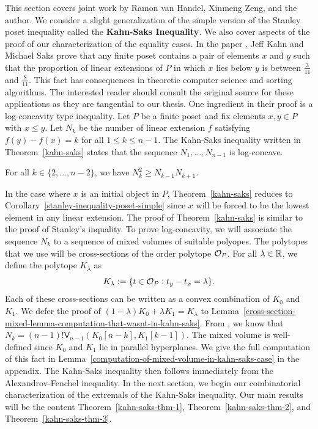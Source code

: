 \documentclass{puthesis-UG}
\begin{document}
This section covers joint work by Ramon van Handel, Xinmeng Zeng, and the author. We consider a slight generalization of the simple version of the Stanley poset inequality called the \textbf{Kahn-Saks Inequality}. We also cover aspects of the proof of our characterization of the equality cases. In the paper \cite{balancing-poset-extensions}, Jeff Kahn and Michael Saks prove that any finite poset contains a pair of elements $x$ and $y$ such that the proportion of linear extensions of $P$ in which $x$ lies below $y$ is between $\frac{3}{11}$ and $\frac{8}{11}$. This fact has consequences in theoretic computer science and sorting algorithms. The interested reader should consult the original source \cite{balancing-poset-extensions} for these applications as they are tangential to our thesis. One ingredient in their proof is a log-concavity type inequality. Let $P$ be a finite poset and fix elements $x, y \in P$ with $x \leq y$. Let $N_k$ be the number of linear extension $f$ satisfying $f(y) - f(x) = k$ for all $1 \leq k \leq n-1$. The Kahn-Saks inequality written in Theorem~\ref{kahn-saks} states that the sequence $N_1, \ldots, N_{n-1}$ is log-concave. 

\begin{thm} \label{kahn-saks}
	For all $k \in \{2, \ldots, n-2\}$, we have $N_k^2 \geq N_{k-1} N_{k+1}$. 
\end{thm}

In the case where $x$ is an initial object in $P$, Theorem~\ref{kahn-saks} reduces to Corollary~\ref{stanley-inequality-poset-simple} since $x$ will be forced to be the lowest element in any linear extension. The proof of Theorem~\ref{kahn-saks} is similar to the proof of Stanley's inquality. To prove log-concavity, we will associate the sequence $N_k$ to a sequence of mixed volumes of suitable polyopes. The polytopes that we use will be cross-sections of the order polytope $\mathcal{O}_P$. For all $\lambda \in \mathbb{R}$, we define the polytope $K_\lambda$ as 
\[
	K_\lambda := \{t \in \mathcal{O}_P : t_y - t_x = \lambda\}.
\]
Each of these cross-sections can be written as a convex combination of $K_0$ and $K_1$. We defer the proof of $(1-\lambda)K_0 + \lambda K_1 = K_\lambda$ to Lemma~\ref{cross-section-mixed-lemma-computation-that-wasnt-in-kahn-saks}. From \cite{balancing-poset-extensions}, we know that $N_k =(n-1)! \mathsf{V}_{n-1}(K_0 [n-k], K_1[k-1])$. The mixed volume is well-defined since $K_0$ and $K_1$ lie in parallel hyperplanes. We give the full computation of this fact in Lemma~\ref{computation-of-mixed-volume-in-kahn-saks-case} in the appendix. The Kahn-Saks inequality then follows immediately from the Alexandrov-Fenchel inequality. In the next section, we begin our combinatorial characterization of the extremals of the Kahn-Saks inequality. Our main results will be the content Theorem~\ref{kahn-saks-thm-1}, Theorem~\ref{kahn-saks-thm-2}, and Theorem~\ref{kahn-saks-thm-3}. 
\end{document}
